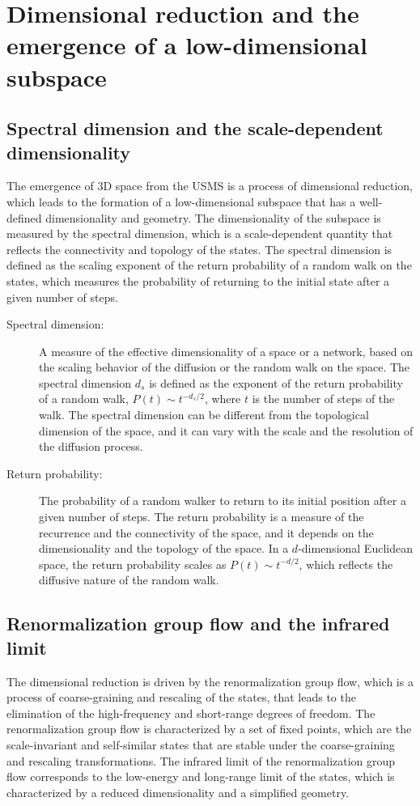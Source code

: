 
\section{Dimensional reduction and the emergence of a low-dimensional subspace}
\subsection{Spectral dimension and the scale-dependent dimensionality}
The emergence of 3D space from the USMS is a process of dimensional reduction, which leads to the formation of a low-dimensional subspace that has a well-defined dimensionality and geometry. The dimensionality of the subspace is measured by the spectral dimension, which is a scale-dependent quantity that reflects the connectivity and topology of the states. The spectral dimension is defined as the scaling exponent of the return probability of a random walk on the states, which measures the probability of returning to the initial state after a given number of steps.

\begin{tcolorbox}[colback=blue!5!white,colframe=blue!75!black,title=New terms]
\begin{description}
\item[Spectral dimension:] A measure of the effective dimensionality of a space or a network, based on the scaling behavior of the diffusion or the random walk on the space. The spectral dimension $d_s$ is defined as the exponent of the return probability of a random walk, $P(t) \sim t^{-d_s/2}$, where $t$ is the number of steps of the walk. The spectral dimension can be different from the topological dimension of the space, and it can vary with the scale and the resolution of the diffusion process.
\item[Return probability:] The probability of a random walker to return to its initial position after a given number of steps. The return probability is a measure of the recurrence and the connectivity of the space, and it depends on the dimensionality and the topology of the space. In a $d$-dimensional Euclidean space, the return probability scales as $P(t) \sim t^{-d/2}$, which reflects the diffusive nature of the random walk.
\end{description}
\end{tcolorbox}

\subsection{Renormalization group flow and the infrared limit}
The dimensional reduction is driven by the renormalization group flow, which is a process of coarse-graining and rescaling of the states, that leads to the elimination of the high-frequency and short-range degrees of freedom. The renormalization group flow is characterized by a set of fixed points, which are the scale-invariant and self-similar states that are stable under the coarse-graining and rescaling transformations. The infrared limit of the renormalization group flow corresponds to the low-energy and long-range limit of the states, which is characterized by a reduced dimensionality and a simplified geometry.

